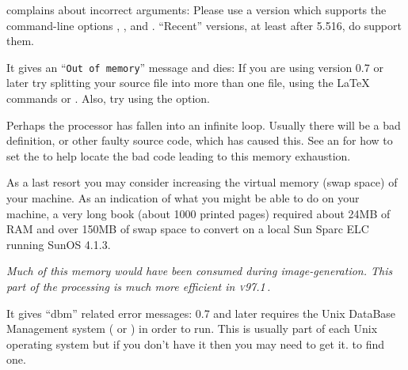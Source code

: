 \begin{htmllist}
\item [\fn{dvips} complains about incorrect arguments:\label{dvips} ]
Please use a version which supports the command-line options , ,
 and . ``Recent'' versions, at least after 5.516, do support them.


\item [It gives an ``\texttt{Out of memory}'' message and dies: ] 
If you are using version \latextohtml{} 0.7 or later try splitting your 
source file into more than one file, using the \LaTeX{} 
commands  or . 
Also, try using the  option.

\begin{changebar}
Perhaps the processor has fallen into an infinite loop.
Usually there will be a bad definition, or other faulty source code,
which has caused this. 
See an  for
how to set the   to 
help locate the bad code leading to this memory exhaustion.
\end{changebar}%

As a last resort you may consider increasing the virtual memory
(swap space) of your machine. As an indication 
of what you might be able to do on your machine,
a very long book (about 1000 printed pages) required about 
24MB of RAM and over 150MB of swap space to convert on a local Sun Sparc ELC
running SunOS 4.1.3.
\begin{changebar}
\newline\textit
{Much of this memory would have been consumed during image-generation.
This part of the processing is much more efficient in \textsc{v97.1}\,.}
\end{changebar}%


\item [It gives ``dbm'' related error messages: ]
\latextohtml{} 0.7 and later requires the
Unix DataBase Management system ( or ) in order to run.
This is usually part of each Unix operating system but if you 
don't have it then you may need to get it. 
to find one.


\end{htmllist}
